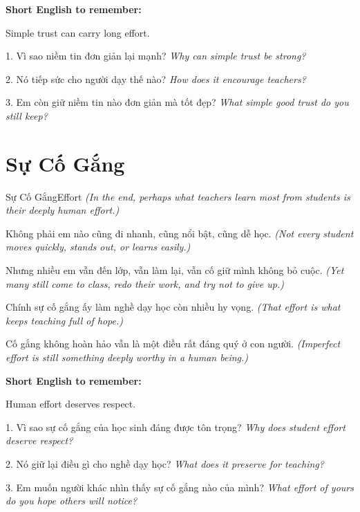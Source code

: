\begin{ghinhoanh}
\textbf{Short English to remember:}

Simple trust can carry long effort.

\end{ghinhoanh}

\begin{tuhocnhanh}
1. Vì sao niềm tin đơn giản lại mạnh? \textit{Why can simple trust be strong?}

2. Nó tiếp sức cho người dạy thế nào? \textit{How does it encourage teachers?}

3. Em còn giữ niềm tin nào đơn giản mà tốt đẹp? \textit{What simple good trust do you still keep?}
\end{tuhocnhanh}
\ngancach

\section{Sự Cố Gắng}
\begin{truyen}{Sự Cố Gắng}{Effort}
\textit{(In the end, perhaps what teachers learn most from students is their deeply human effort.)}

Không phải em nào cũng đi nhanh, cũng nổi bật, cũng dễ học.
\textit{(Not every student moves quickly, stands out, or learns easily.)}

Nhưng nhiều em vẫn đến lớp, vẫn làm lại, vẫn cố giữ mình không bỏ cuộc.
\textit{(Yet many still come to class, redo their work, and try not to give up.)}

Chính sự cố gắng ấy làm nghề dạy học còn nhiều hy vọng.
\textit{(That effort is what keeps teaching full of hope.)}
\end{truyen}

\begin{baihoc}
Cố gắng không hoàn hảo vẫn là một điều rất đáng quý ở con người.
\textit{(Imperfect effort is still something deeply worthy in a human being.)}
\end{baihoc}

\begin{ghinhoanh}
\textbf{Short English to remember:}

Human effort deserves respect.

\end{ghinhoanh}

\begin{tuhocnhanh}
1. Vì sao sự cố gắng của học sinh đáng được tôn trọng? \textit{Why does student effort deserve respect?}

2. Nó giữ lại điều gì cho nghề dạy học? \textit{What does it preserve for teaching?}

3. Em muốn người khác nhìn thấy sự cố gắng nào của mình? \textit{What effort of yours do you hope others will notice?}
\end{tuhocnhanh}
\ngancach